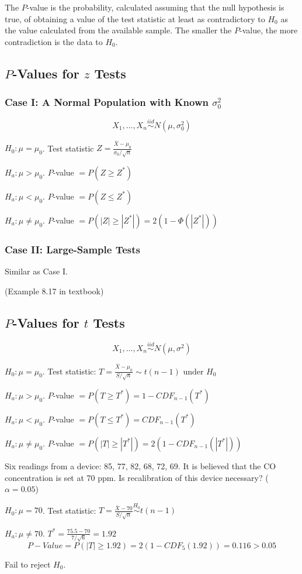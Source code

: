 \begin{defn}
The $P$-value is the probability, calculated assuming that the null hypothesis is true, of obtaining a value of the test statistic at least as contradictory to $H_0$ as the value calculated from the available sample. The smaller the $P$-value, the more contradiction is the data to $H_0$.
\end{defn}

\subsection{$P$-Values for $z$ Tests}
\subsubsection{Case I: A Normal Population with Known $\sigma_0^2$}
\[X_1,\dots,X_n \overset{iid}{\sim} N(\mu,\sigma_0^2)\]

$H_0:\mu=\mu_0$. Test statistic $Z=\frac{\bar{X}-\mu_0}{\sigma_0/\sqrt{n}}$

$H_a:\mu>\mu_0$. $P$-value $= P(Z \geq Z^*)$

$H_a:\mu<\mu_0$. $P$-value $= P(Z \leq Z^*)$

$H_a:\mu\neq\mu_0$. $P$-value $= P(|Z| \geq |Z^*|)=2(1-\Phi(|Z^*|))$

\subsubsection{Case II: Large-Sample Tests}
Similar as Case I.

\begin{exmp}
(Example 8.17 in textbook)
\end{exmp}

\subsection{$P$-Values for $t$ Tests}
\[X_1,\dots,X_n \overset{iid}{\sim} N(\mu,\sigma^2)\]

$H_0:\mu=\mu_0$. Test statistic: $T=\frac{\bar{X}-\mu_0}{S/\sqrt{n}} \sim t(n-1) \text{ under } H_0$

$H_a:\mu>\mu_0$. $P$-value $= P(T \geq T^*)=1-CDF_{n-1}(T^*)$

$H_a:\mu<\mu_0$. $P$-value $= P(T \leq T^*)=CDF_{n-1}(T^*)$

$H_a:\mu\neq\mu_0$. $P$-value $= P(|T| \geq |T^*|)=2(1-CDF_{n-1}(|T^*|))$

\begin{exmp}
Six readings from a device: 85, 77, 82, 68, 72, 69. It is believed that the CO concentration is set at 70 ppm. Is recalibration of this device necessary? ($\alpha=0.05$)

$H_0:\mu=70$. Test statistic: $T=\frac{\bar{X}-70}{S/\sqrt{n}} \overset{H_0}{\sim} t(n-1) $

$H_a:\mu\neq 70$. $T^*=\frac{75.5-70}{7/\sqrt{6}}=1.92 $
\[P-Value=P(|T|\geq 1.92)=2(1-CDF_5(1.92))=0.116>0.05\]

Fail to reject $H_0$.
\end{exmp}

